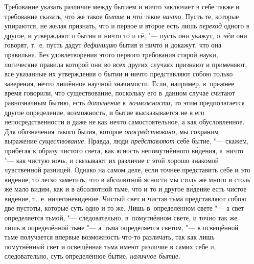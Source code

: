 Требование указать различие между бытием и ничто заключает в себе также и
требование сказать, чт\'{о} же такое {\em бытие} и чт\'{о} такое {\em ничто}.
Пусть те, которые упираются, не желая признать, что и первое и второе есть лишь
{\em переход} одного в другое, и утверждают о бытии и ничто то и сё, "--- пусть
они укажут, о~{\em чём} они говорят, т.~е. пусть дадут {\em дефиницию} бытия и
ничто и докажут, что она правильна. Без удовлетворения этого первого требования
старой науки, логические правила которой они во всех других случаях признают и
применяют, все указанные их утверждения о бытии и ничто представляют собою
только заверения, нечто лишённое научной значимости. Если, например, в~прежнее
время говорили, что существование, поскольку его в~данном случае считают
равнозначным бытию, есть {\em дополнение} к~{\em возможности,} то этим
предполагается другое определение, возможность, и бытие высказывается не в его
непосредственности и даже не как нечто самостоятельное, а как обусловленное.
Для обозначения такого бытия, которое {\em опосредствовано,} мы сохраним
выражение {\em существование}. Правда, люди {\em представляют} себе бытие, "---
скажем, прибегая к образу чистого света, как ясность непомутнённого
в\'{и}дения, а~ничто "--- как чистую ночь, и связывают их различие с этой
хорошо знакомой чувственной разницей. Однако на самом деле, если точнее
представить себе и это в\'{и}дение, то легко заметить, что в абсолютной ясности
мы столь же много и столь же мало видим, как и в абсолютной тьме, что и то и
другое в\'{и}дение есть чистое в\'{и}дение, т.~е. ничегоневидение. Чистый свет
и чистая тьма представляют собою две пустоты, которые суть одно и то же. Лишь
в~определённом свете "--- а свет определяется тьмой, "--- следовательно,
в~помутнённом свете, и точно так же лишь в определённой тьме "--- а~тьма
определяется светом, "--- в освещённой тьме получается впервые возможность
что-то различать, так как лишь помутнённый свет и освещённая тьма имеют
различие в самих себе и, следовательно, суть определённое бытие,
{\em наличное бытие}.


